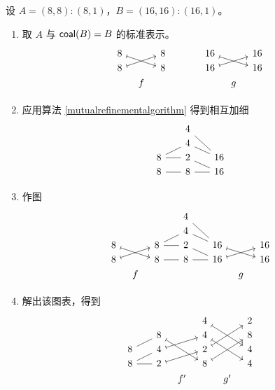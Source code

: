\begin{example}
       设 $A =(8,8):(8,1)$，$B = (16,16):(16,1)$。
    \begin{enumerate}
        \item 取 $A$ 与 $\mathsf{coal}(B) = B$ 的标准表示。
        \[ \begin{tikzcd} [row sep = 1, column sep = 8]
        8 \ar[drr,mapsto] & & 8 & & & & 16 \ar[drr,mapsto] & & 16\\
        8 \ar[urr,mapsto] & & 8 & & & & 16 \ar[urr,mapsto] & & 16\\
        & f & & & & & & g & \\
        \end{tikzcd} \]
        \item 应用算法 \ref{mutualrefinementalgorithm} 得到相互加细
        \[ \begin{tikzcd} [row sep = 1, column sep = 8]
         & & 4 & & \\
         & & 4 & & \\
        8 \ar[rr,-] \ar[urr,-] & & 2 & & \ar[ull,-] \ar[uull,-] 16\\
        8 \ar[rr,-] & & 8 & & \ar[ll,-] \ar[ull,-] 16\\
        \end{tikzcd} \]
        \item 作图
        \[
\begin{tikzcd}[row sep = 1,column sep = 8]
  & &   & & 4 \ar[ddrr,-] & &    & & \\
  & &   & & 4 \ar[drr,-] & &    & & \\
8 \ar[drr,mapsto] & & 8 \ar[rr,-] \ar[urr,-] & & 2 \ar[drr,-] & & 16 \ar[drr,mapsto] & & 16\\
8 \ar[urr,mapsto] & & 8 \ar[rr,-] & & 8 \ar[rr,-] & & 16 \ar[urr,mapsto] & & 16\\
  &f&   & &   & &   &g& \\
\end{tikzcd}
\]

        \item 解出该图表，得到
        \[ \begin{tikzcd} [row sep = 1, column sep = 8]
        & & & & 4 \ar[ddrr,mapsto] & & 2\\
         & & 8 \ar[ddrr,mapsto] & & 4 \ar[ddrr,mapsto] & & 8\\
        8 \ar[urr,-] & & 4 \ar[urr,mapsto] & & 2 \ar[uurr,mapsto] & & 4\\
        8 \ar[rr,-] \ar[urr,-] & & 2 \ar[urr,mapsto] & & 8 \ar[uurr,mapsto] & & 4\\
        & & & f' & & g' & \\
        \end{tikzcd} \]


\end{enumerate}
\end{example}
